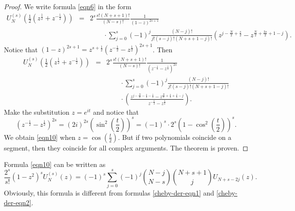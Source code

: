 \documentclass[12pt]{article}
\newcommand{\pa}[1]{\left(#1\right)}
\begin{document}
\begin{proof}
We write formula \eqref{eqn6} in the form
\begin{eqnarray*}
U_{N}^{(s)}\pa{\frac{1}{2}\pa{z^{\frac{1}{2}} + z^{-\frac{1}{2}}}} &=& 2^{s}\frac{s!(N + s + 1)!}{(N - s)!} \frac{1}{(1 - z)^{2s + 1}} \\
& & \qquad \cdot \sum_{j = 0}^{s} (-1)^j \frac{(N - j)!}{j!(s - j)!(N + s + 1 - j)!}\pa{z^{j - \frac{N}{2} + \frac{s}{2}} - z^{\frac{N}{2} + \frac{3s}{2} + 1 - j}}.
\end{eqnarray*}
Notice that
$\displaystyle (1 - z)^{2s + 1} = z^{s + \frac{1}{2}}\pa{z^{-\frac{1}{2}} - z^{\frac{1}{2}}}^{2s + 1}$. Then
\begin{eqnarray*}
U_{N}^{(s)}\pa{\frac{1}{2}\pa{z^{\frac{1}{2}} + z^{-\frac{1}{2}}}} &=& 2^{s}\frac{s!(N + s + 1)!}{(N - s)!} \frac{1}{ \pa{z^{-\frac{1}{2}} - z^{\frac{1}{2}}}^{2s}} \\
& & \qquad \cdot \sum_{j = 0}^{s} (-1)^j \frac{(N - j)!}{j!(s - j)!(N + s + 1 - j)!} \\
& & \qquad \cdot \pa{\frac{z^{j - \frac{N}{2} - \frac{s}{2} - \frac{1}{2}} - z^{\frac{N}{2} + \frac{s}{2} + \frac{1}{2} - j}}{z^{-\frac{1}{2}} - z^{\frac{1}{2}}}}.
\end{eqnarray*}
Make the substitution $z = e^{it}$ and notice that 
\begin{displaymath}
\pa{z^{-\frac{1}{2}} - z^{\frac{1}{2}}}^{2s} = (2i)^{2s}\pa{\sin^2\pa{\frac{t}{2}}}^s = (-1)^s\cdot 2^s\pa{1 - \cos^2\pa{\frac{t}{2}}}^s.
\end{displaymath}
We obtain \eqref{eqn10} when $\displaystyle z = \cos\pa{\frac{t}{2}}$. But if two polynomials coincide on a segment, then they coincide for all complex arguments. The theorem is proven.
\end{proof}

Formula \eqref{eqn10} can be written as
\begin{displaymath}
\frac{2^s}{s!}(1 - z^2)^sU_{N}^{(s)}(z) = (-1)^s \sum_{j=0}^s (-1)^j {N-j \choose N-s}{N + s + 1 \choose j}U_{N + s - 2j}(z).
\end{displaymath}
Obviously, this formula is different from formulas \eqref{cheby-der-eqn1} and \eqref{cheby-der-eqn2}.
\end{document}
